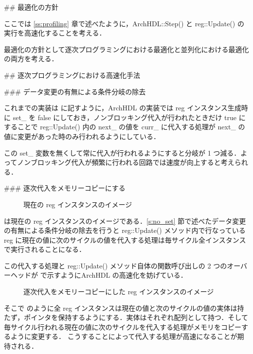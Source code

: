## 最適化の方針

ここでは \ref{ss:profiling} 章で述べたように，ArchHDL::Step() と reg::Update() の実行を高速化することを考える．

最適化の方針として逐次プログラミングにおける最適化と並列化における最適化の両方を考える．


## 逐次プログラミングにおける高速化手法

### データ変更の有無による条件分岐の除去 \label{s:no_set}

これまでの実装は  に記すように，ArchHDL の実装では reg インスタンス生成時に set_ を false
にしておき，ノンブロッキング代入が行われたときだけ true にすることで
reg::Update() 内の next_ の値を curr_
に代入する処理が next_ の値に変更があった時のみ行われるようにしている．

この set_ 変数を無くして常に代入が行われるようにすると分岐が 1 つ減る．よってノンブロッキング代入が頻繁に行われる回路では速度が向上すると考えられる．


### 逐次代入をメモリーコピーにする

\begin{figure}[t]
 \begin{center}
  
 \end{center}
 \caption{現在の reg インスタンスのイメージ}
 \label{fig:reg_curr_next}
\end{figure}

 は現在の reg インスタンスのイメージである．\ref{s:no_set} 節で述べたデータ変更の有無による条件分岐の除去を行うと reg::Update() メソッド内で行なっている reg に現在の値に次のサイクルの値を代入する処理は毎サイクル全インスタンスで実行されることになる．

この代入する処理と reg::Update() メソッド自体の関数呼び出しの
2 つのオーバーヘッドが で示すようにArchHDL の高速化を妨げている．

\begin{figure}[t]
 \begin{center}
  
 \end{center}
 \caption{逐次代入をメモリーコピーにした reg インスタンスのイメージ}
 \label{fig:mem_copy}
\end{figure}


そこで のように全 reg インスタンスは現在の値と次のサイクルの値の実体は持たず，ポインタを保持するようにする．実体はそれぞれ配列として持つ．そして毎サイクル行われる現在の値に次のサイクルを代入する処理がメモリをコピーするように変更する．
こうすることによって代入する処理が高速になることが期待される．

